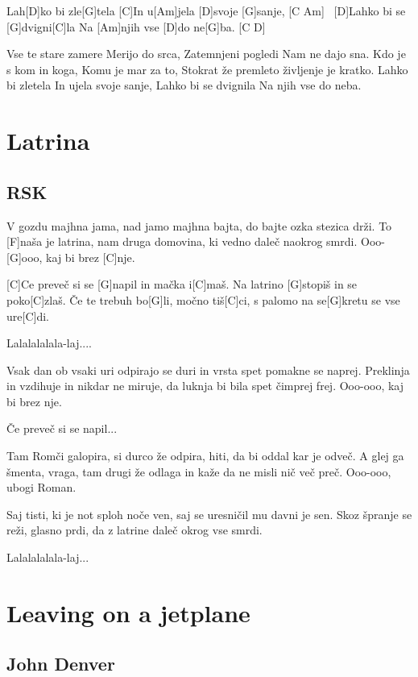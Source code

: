 \documentclass[a4paper,12pt]{article}
\begin{document}
\begin{multicols}{2}
\begin{guitar}
Lah[D]ko bi zle[G]tela
[C]In u[Am]jela [D]svoje [G]sanje, [C Am] \
[D]Lahko bi se [G]dvigni[C]la
Na [Am]njih vse [D]do ne[G]ba. [C D] \



Vse te stare zamere
Merijo do srca,
Zatemnjeni pogledi
Nam ne dajo sna.
Kdo je s kom in koga,
Komu je mar za to,
Stokrat že premleto
življenje je kratko.
Lahko bi zletela
In ujela svoje sanje,
Lahko bi se dvignila
Na njih vse do neba.

\end{guitar}
\section{Latrina}
\subsection*{RSK}
\begin{guitar}
[C]V gozdu majhna jama,
nad jamo majhna bajta,
do bajte ozka stezica drži.
To [F]naša je latrina,
nam druga domovina,
ki vedno daleč naokrog smrdi.
Ooo-[G]ooo, kaj bi brez [C]nje.


[C]Ce preveč si se [G]napil in mačka i[C]maš.
Na latrino [G]stopiš in se poko[C]zlaš.
Če te trebuh bo[G]li, močno tiš[C]ci,
s palomo na se[G]kretu se vse ure[C]di.


Lalalalalala-laj....


Vsak dan ob vsaki uri
odpirajo se duri
in vrsta spet pomakne se naprej.
Preklinja in vzdihuje in nikdar ne miruje,
da luknja bi bila spet čimprej frej.
Ooo-ooo, kaj bi brez nje.


Če preveč si se napil...


Tam Romči galopira, 
si durco že odpira,
hiti, da bi oddal kar je odveč.
A glej ga šmenta, vraga,
tam drugi že odlaga
in kaže da ne misli nič več preč.
Ooo-ooo, ubogi Roman.


Saj tisti, ki je not sploh noče ven, 
saj se uresničil mu davni je sen.
Skoz špranje se reži, glasno prdi,
da z latrine daleč okrog vse smrdi.


Lalalalalala-laj...

\end{guitar}
\section{Leaving on a jetplane}
\subsection*{John Denver}
\begin{guitar}
[D7]


\end{guitar}
\end{multicols}
\end{document}
